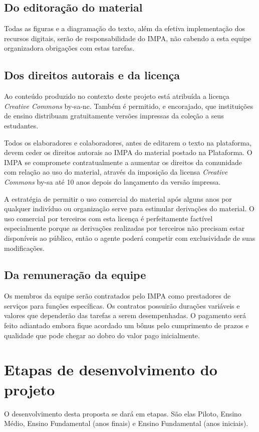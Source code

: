 \documentclass[10 pt]{article}
\begin{document}
\subsection{Do editoração do material}

Todas as figuras e a diagramação do texto, além da efetiva implementação dos recursos digitais, serão de responsabilidade do IMPA, não cabendo a esta equipe organizadora obrigações com estas tarefas.

\subsection{Dos direitos autorais e da licença}


Ao conteúdo produzido no contexto deste projeto está atribuída a licença {\it Creative Commons} by-sa-nc.
Também é permitido, e encorajado, que instituições de ensino distribuam gratuitamente versões impressas da coleção a seus estudantes. 

Todos os elaboradores e colaboradores, antes de editarem o texto na plataforma, devem ceder os direitos autorais ao IMPA do material postado na Plataforma.
O IMPA se compromete contratualmente a aumentar os direitos da comunidade com relação ao uso do  material, através da imposição da licensa {\it Creative Commons} by-sa até 10 anos depois do lançamento da versão impressa.

A estratégia de permitir o uso comercial do material após alguns anos por qualquer indivíduo ou organização serve para estimular derivações do material.
O uso comercial por terceiros com esta licença é perfeitamente factível especialmente porque as derivações realizadas por terceiros não precisam estar disponíveis ao público, então o agente poderá competir com exclusividade de suas modificações.

\subsection{Da remuneração da equipe}

Os membros da equipe serão contratados pelo IMPA como prestadores de serviços para funções específicas. 
Os contratos possuirão durações variáveis e valores que dependerão das tarefas a serem desempenhadas.
O pagamento será feito adiantado embora fique acordado um bônus pelo cumprimento de prazos e qualidade que pode chegar ao dobro do valor pago inicialmente.


\section{Etapas de desenvolvimento do projeto}
O desenvolvimento desta proposta se dará em etapas. São elas Piloto, Ensino Médio, Ensino Fundamental (anos finais) e Ensino Fundamental (anos iniciais).
\end{document}
